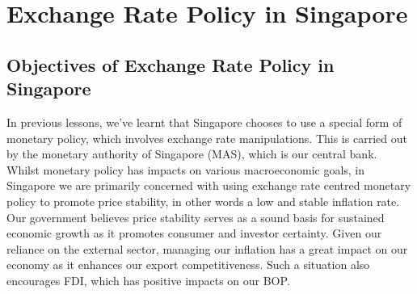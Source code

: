 \documentclass[DIV=classic,11pt,numbers=noenddot,listof=totoc,bibliography=totoc,parskip]{scrartcl}
\begin{document}
\section{Exchange Rate Policy in Singapore}
\subsection{Objectives of Exchange Rate Policy in Singapore}
In previous lessons, we’ve learnt that Singapore chooses to use a special form of monetary policy, which involves exchange rate manipulations. This is carried out by the monetary authority of Singapore (MAS), which is our central bank. Whilst monetary policy has impacts on various macroeconomic goals, in Singapore we are primarily concerned with using exchange rate centred monetary policy to promote price stability, in other words a low and stable inflation rate. Our government believes price stability serves as a sound basis for sustained economic growth as it promotes consumer and investor certainty. Given our reliance on the external sector, managing our inflation has a great impact on our economy as it enhances our export competitiveness. Such a situation also encourages FDI, which has positive impacts on our BOP.
\end{document}
